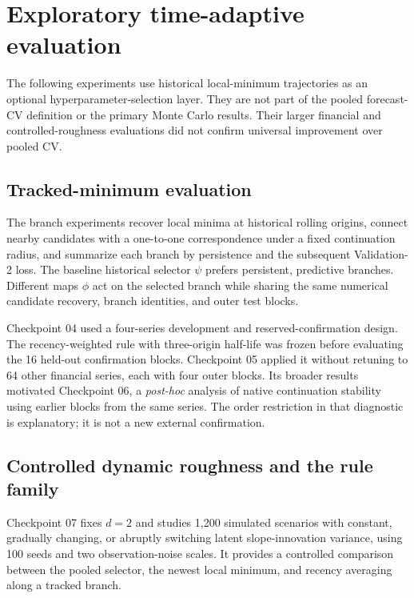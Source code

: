 \section{Exploratory time-adaptive evaluation}
\label{app:adaptive_evaluation}

The following experiments use historical
local-minimum trajectories as an optional
hyperparameter-selection layer. They are
not part of the pooled forecast-CV definition
or the primary Monte Carlo results. Their
larger financial and controlled-roughness
evaluations did not confirm universal
improvement over pooled CV.

\subsection{Tracked-minimum evaluation}

The branch experiments recover local minima at historical rolling
origins, connect nearby candidates with a one-to-one correspondence
under a fixed continuation radius, and summarize each branch by
persistence and the subsequent Validation-2 loss. The baseline
historical selector $\psi$ prefers persistent, predictive branches.
Different maps $\phi$ act on the selected branch while sharing the
same numerical candidate recovery, branch identities, and outer
test blocks.

Checkpoint 04 used a four-series development and reserved-confirmation
design. The recency-weighted rule with three-origin half-life was
frozen before evaluating the 16 held-out confirmation blocks.
Checkpoint 05 applied it without retuning to 64 other financial
series, each with four outer blocks. Its broader results motivated
Checkpoint 06, a \emph{post-hoc} analysis of native continuation
stability using earlier blocks from the same series. The order
restriction in that diagnostic is explanatory; it is not a new
external confirmation.

\subsection{Controlled dynamic roughness and the rule family}

Checkpoint 07 fixes $d=2$ and studies 1,200 simulated scenarios with
constant, gradually changing, or abruptly switching latent
slope-innovation variance, using 100 seeds and two observation-noise
scales. It provides a controlled comparison between the pooled
selector, the newest local minimum, and recency averaging along a
tracked branch.

